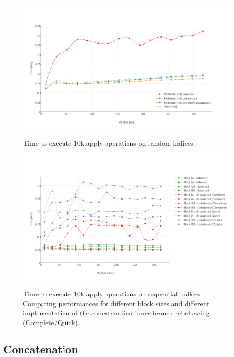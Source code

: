 \begin{figure}[h!]
  \centering
  \includegraphics[width=\textwidth]{Benchmarks/Apply_random_3.pdf}
  \label{ApplyRandomBenchmarks}
  \caption{Time to execute 10k apply operations on random indices.}
\end{figure}

\begin{figure}[h!]
  \centering
  \includegraphics[width=\textwidth]{Benchmarks/apply_blocks.pdf}
  \label{ApplyBlocksBenchmarks}
  \caption{Time to execute 10k apply operations on sequential indices. Comparing performances for different block sizes and different implementation of the concatenation inner branch rebalancing (Complete/Quick).}
\end{figure}

\subsection{Concatenation}


